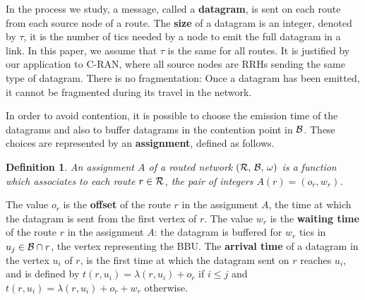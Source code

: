 \documentclass[a4paper,10pt]{journal}
\newtheorem{definition}{Definition}
\begin{document}
        In the process we study, a message, called a {\bf datagram}, is sent on each route from each source node of a route. The \textbf{size} of a datagram is an integer, denoted by $\tau$, it is the number of tics needed by a node to emit the full datagram in a link. In this paper, we assume that $\tau$ is the same for all routes. It is justified by our application to C-RAN, where all source nodes are RRHs sending the same type of datagram. There is no fragmentation: Once a datagram has been emitted, it cannot be fragmented during its travel in the network. 

        In order to avoid contention, it is possible to choose the emission time of the datagrams and also to buffer datagrams in the contention point in $\cal{B}$.
        These choices are represented by an \textbf{assignment}, defined as follows.

         \begin{definition}
         An assignment $A$ of a routed network $(\cal{R},\,\cal{B},\,\omega)$ is a function which associates to each route $r \in \cal{R}$, the pair of integers $A(r) = (o_r,w_r)$.
         \end{definition}
        The value $o_r$ is the \textbf{offset} of the route $r$ in the assignment $A$, the time at which the datagram is sent from the first vertex of $r$.
         The value $w_r$ is the \textbf{waiting time} of the route $r$ in the assignment $A$: the datagram is buffered for $w_r$ tics in $u_j \in {\cal B} \cap r$, the vertex representing the BBU.
 		The \textbf{arrival time} of a datagram in the vertex $u_i$ of $r$, is the first time at which the datagram sent on $r$ reaches $u_i$, and is defined by $t(r,u_i) = \lambda(r,u_i) + o_r $ if 
 		$i \leq j$ and $t(r,u_i) = \lambda(r,u_i) + o_r + w_r$ otherwise.
\end{document}
